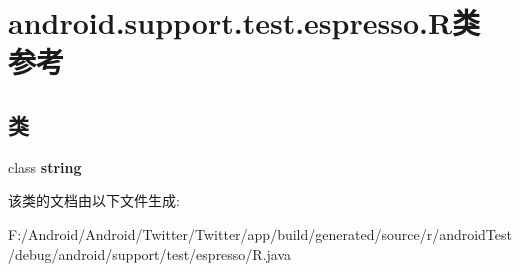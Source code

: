 \hypertarget{classandroid_1_1support_1_1test_1_1espresso_1_1_r}{}\section{android.\+support.\+test.\+espresso.\+R类 参考}
\label{classandroid_1_1support_1_1test_1_1espresso_1_1_r}
\subsection*{类}
\begin{DoxyCompactItemize}
\item 
class {\bfseries string}
\end{DoxyCompactItemize}


该类的文档由以下文件生成\+:\begin{DoxyCompactItemize}
\item 
F\+:/\+Android/\+Android/\+Twitter/\+Twitter/app/build/generated/source/r/android\+Test/debug/android/support/test/espresso/R.\+java\end{DoxyCompactItemize}
